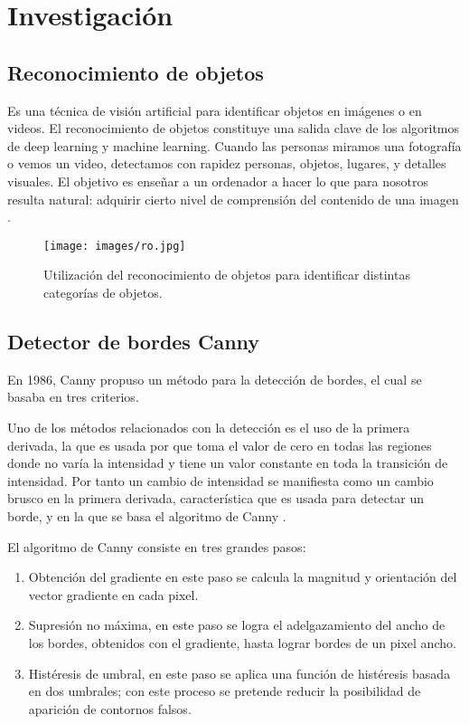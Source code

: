 \documentclass{article}
\begin{document}
\section{Investigación}
\subsection*{Reconocimiento de objetos}
Es una técnica de visión artificial para identificar objetos en imágenes o en videos.
El reconocimiento de objetos constituye una salida clave de los algoritmos de deep learning y machine learning. Cuando las personas miramos una fotografía o vemos un video, detectamos con rapidez personas, objetos, lugares, y detalles visuales. El objetivo es enseñar a un ordenador a hacer lo que para nosotros resulta natural: adquirir cierto nivel de comprensión del contenido de una imagen \cite{mathworks_object_recognition}.

\begin{figure}[!ht]
  \centering
  \texttt{[image: images/ro.jpg]}
  \caption{Utilización del reconocimiento de objetos para identificar distintas categorías de objetos.}
\end{figure}

\subsection*{Detector de bordes Canny}

En 1986, Canny propuso un método para la detección de bordes, el cual se basaba en tres criterios.

Uno de los métodos relacionados con la detección es el uso de la primera derivada, la que es usada por que toma el valor de cero en todas las regiones donde no varía la intensidad y tiene un valor constante en toda la transición de intensidad. Por tanto un cambio de intensidad se manifiesta como un cambio brusco en la primera derivada, característica que es usada para detectar un borde, y en la que se basa el algoritmo de Canny \cite{valdes_deteccion_bordes_canny}.

El algoritmo de Canny consiste en tres grandes pasos:

\begin{enumerate}
  \item Obtención del gradiente en este paso se calcula la magnitud y orientación del vector gradiente en cada pixel.
  \item Supresión no máxima, en este paso se logra el adelgazamiento del ancho de los bordes, obtenidos con el gradiente, hasta lograr bordes de un pixel ancho.
  \item Histéresis de umbral, en este paso se aplica una función de histéresis basada en dos umbrales; con este proceso se pretende reducir la posibilidad de aparición de contornos falsos.
\end{enumerate}
\end{document}
